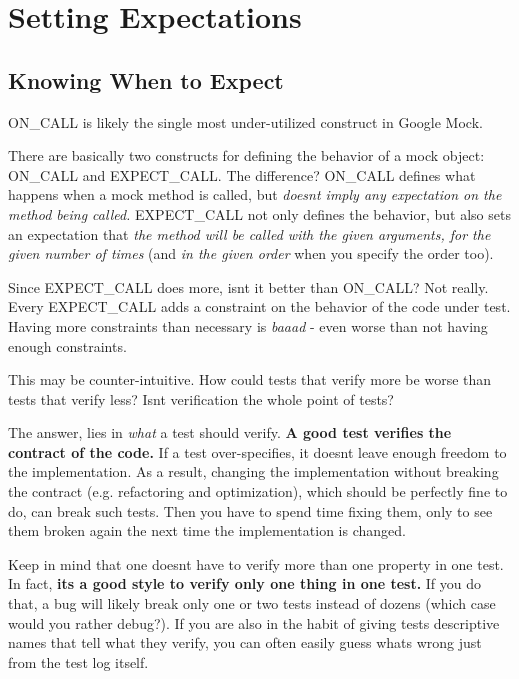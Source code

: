\section*{Setting Expectations}

\subsection*{Knowing When to Expect}

{\ttfamily O\+N\+\_\+\+C\+A\+LL} is likely the single most under-\/utilized construct in Google Mock.

There are basically two constructs for defining the behavior of a mock object\+: {\ttfamily O\+N\+\_\+\+C\+A\+LL} and {\ttfamily E\+X\+P\+E\+C\+T\+\_\+\+C\+A\+LL}. The difference? {\ttfamily O\+N\+\_\+\+C\+A\+LL} defines what happens when a mock method is called, but {\itshape doesn\textquotesingle{}t imply any expectation on the method being called.} {\ttfamily E\+X\+P\+E\+C\+T\+\_\+\+C\+A\+LL} not only defines the behavior, but also sets an expectation that {\itshape the method will be called with the given arguments, for the given number of times} (and {\itshape in the given order} when you specify the order too).

Since {\ttfamily E\+X\+P\+E\+C\+T\+\_\+\+C\+A\+LL} does more, isn\textquotesingle{}t it better than {\ttfamily O\+N\+\_\+\+C\+A\+LL}? Not really. Every {\ttfamily E\+X\+P\+E\+C\+T\+\_\+\+C\+A\+LL} adds a constraint on the behavior of the code under test. Having more constraints than necessary is {\itshape baaad} -\/ even worse than not having enough constraints.

This may be counter-\/intuitive. How could tests that verify more be worse than tests that verify less? Isn\textquotesingle{}t verification the whole point of tests?

The answer, lies in {\itshape what} a test should verify. {\bfseries A good test verifies the contract of the code.} If a test over-\/specifies, it doesn\textquotesingle{}t leave enough freedom to the implementation. As a result, changing the implementation without breaking the contract (e.\+g. refactoring and optimization), which should be perfectly fine to do, can break such tests. Then you have to spend time fixing them, only to see them broken again the next time the implementation is changed.

Keep in mind that one doesn\textquotesingle{}t have to verify more than one property in one test. In fact, {\bfseries it\textquotesingle{}s a good style to verify only one thing in one test.} If you do that, a bug will likely break only one or two tests instead of dozens (which case would you rather debug?). If you are also in the habit of giving tests descriptive names that tell what they verify, you can often easily guess what\textquotesingle{}s wrong just from the test log itself.


